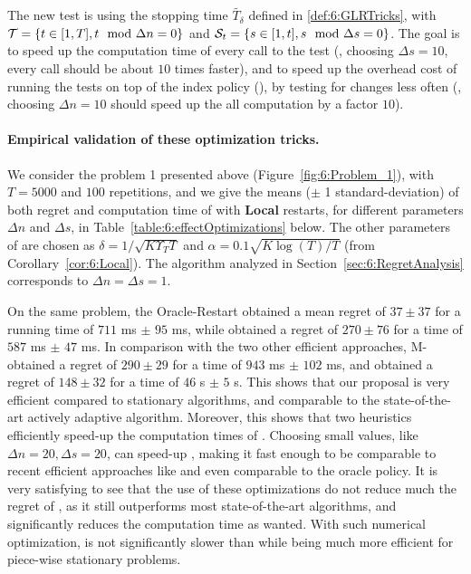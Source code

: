 
The new \GLR{} test is using the stopping time $\tilde{T_\delta}$ defined in \eqref{def:6:GLRTricks},
with $\mathcal{T} = \{t \in [1, T], t \mod \Delta n = 0\}$
and $\mathcal{S}_t = \{s \in [1, t], s \mod \Delta s = 0\}$.
The goal is to speed up the computation time of every call to the \GLR{} test (\eg, choosing $\Delta s = 10$, every call should be about $10$ times faster), and to speed up the overhead cost of running the tests on top of the index policy (\klUCB), by testing for changes less often (\eg, choosing $\Delta n = 10$ should speed up the all computation by a factor $10$).

\paragraph{Empirical validation of these optimization tricks.}
%
We consider the problem 1 presented above (Figure~\ref{fig:6:Problem_1}), with $T=5000$ and $100$ repetitions, and we give the means ($\pm$ 1 standard-deviation) of both regret and computation time of \GLRklUCB{} with \textbf{Local} restarts, for different parameters $\Delta n$ and $\Delta s$, in Table~\ref{table:6:effectOptimizations} below.
The other parameters of \GLRklUCB{} are chosen as $\delta = 1/\sqrt{K \Upsilon_T T}$ and $\alpha = 0.1\sqrt{K\log(T)/T}$ (from Corollary~\ref{cor:6:Local}).
The algorithm analyzed in Section~\ref{sec:6:RegretAnalysis} corresponds to $\Delta n = \Delta s = 1$.

On the same problem,
the Oracle-Restart \klUCB{} obtained a mean regret of $37 \pm 37$ for a running time of $711$ ms $\pm$ $95$ ms,
while \klUCB{} obtained a regret of $270 \pm 76$ for a time of $587$ ms $\pm$ $47$ ms.
In comparison with the two other efficient approaches, M-\klUCB{} obtained a regret of $290 \pm 29$ for a time of $943$ ms $\pm$ $102$ ms,
and \CUSUMklUCB{} obtained a regret of $148 \pm 32$ for a time of $46$ s $\pm$ $5$ s.
%
This shows that our proposal is very efficient compared to stationary algorithms, and comparable to the state-of-the-art actively adaptive algorithm.
Moreover, this shows that two heuristics efficiently speed-up the computation times of \GLRklUCB.
Choosing small values, like $\Delta n = 20, \Delta s = 20$, can speed-up \GLRklUCB, making it fast enough to be comparable to recent efficient approaches like \MUCB{} and even comparable to the oracle policy.
%
It is very satisfying to see that the use of these optimizations do not reduce much the regret of \GLRklUCB, as it still outperforms most state-of-the-art algorithms, and significantly reduces the computation time as wanted.
With such numerical optimization, \GLRklUCB{} is not significantly slower than \klUCB{} while being much more efficient for piece-wise stationary problems.

